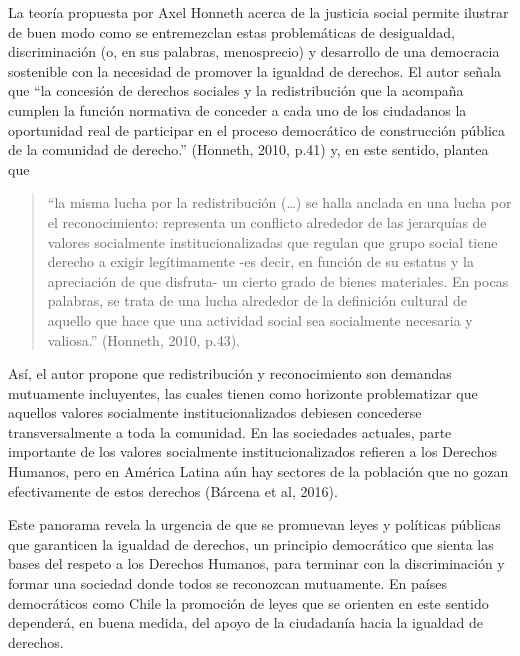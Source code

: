 \documentclass[12pt,twoside]{templates/facsothesis}
\begin{document}
La teoría propuesta por Axel Honneth acerca de la justicia social permite ilustrar de buen modo como se entremezclan estas problemáticas de desigualdad, discriminación (o, en sus palabras, menosprecio) y desarrollo de una democracia sostenible con la necesidad de promover la igualdad de derechos. El autor señala que ``la concesión de derechos sociales y la redistribución que la acompaña cumplen la función normativa de conceder a cada uno de los ciudadanos la oportunidad real de participar en el proceso democrático de construcción pública de la comunidad de derecho.'' (Honneth, 2010, p.41) y, en este sentido, plantea que

\begin{quote}
``la misma lucha por la redistribución (\ldots) se halla anclada en una lucha por el reconocimiento: representa un conflicto alrededor de las jerarquías de valores socialmente institucionalizadas que regulan que grupo social tiene derecho a exigir legítimamente -es decir, en función de su estatus y la apreciación de que disfruta- un cierto grado de bienes materiales. En pocas palabras, se trata de una lucha alrededor de la definición cultural de aquello que hace que una actividad social sea socialmente necesaria y valiosa.'' (Honneth, 2010, p.43).
\end{quote}

Así, el autor propone que redistribución y reconocimiento son demandas mutuamente incluyentes, las cuales tienen como horizonte problematizar que aquellos valores socialmente institucionalizados debiesen concederse transversalmente a toda la comunidad. En las sociedades actuales, parte importante de los valores socialmente institucionalizados refieren a los Derechos Humanos, pero en América Latina aún hay sectores de la población que no gozan efectivamente de estos derechos (Bárcena et al, 2016).

Este panorama revela la urgencia de que se promuevan leyes y políticas públicas que garanticen la igualdad de derechos, un principio democrático que sienta las bases del respeto a los Derechos Humanos, para terminar con la discriminación y formar una sociedad donde todos se reconozcan mutuamente. En países democráticos como Chile la promoción de leyes que se orienten en este sentido dependerá, en buena medida, del apoyo de la ciudadanía hacia la igualdad de derechos.
\end{document}
